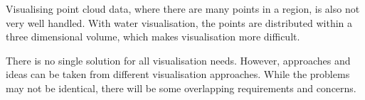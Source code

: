 Visualising point cloud data, where there are many points in a region, is also
not very well handled. With water visualisation, the points are distributed
within a three dimensional volume, which makes visualisation more difficult.

There is no single solution for all visualisation needs. However, approaches
and ideas can be taken from different visualisation approaches. While the
problems may not be identical, there will be some overlapping requirements and
concerns.



